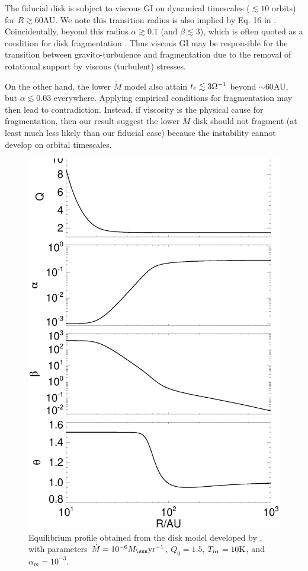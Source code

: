 The fiducial disk is subject to viscous GI on dynamical timescales
($\lesssim 10$ orbits) for $R\gtrsim60$AU. We note this transition
radius is also implied by Eq. 16 in \cite{kratter10}. Coincidentally,
beyond this radius $\alpha\gtrsim 0.1$ (and 
$\beta\lesssim 3$), which is often quoted as a condition for disk
fragmentation   
. Thus viscous GI may be responsible for 
the transition between gravito-turbulence and fragmentation due to the
removal of rotational support by viscous (turbulent) stresses. 

On the other hand, the lower $\dot{M}$ model also attain $t_\mathrm{c}\lesssim
3\Omega^{-1}$ beyond $\sim 60$AU, but $\alpha\lesssim 0.03$
everywhere. 
Applying empirical conditions for fragmentation may then lead to
contradiction. Instead, if viscosity is the physical cause for
fragmentation, then our result suggest the lower $\dot{M}$ disk should
not fragment (at least much less likely than our fiducial case) 
because the instability cannot develop on orbital timescales. 

\begin{figure}
  \includegraphics[width=\linewidth,clip=true,trim=0cm 0cm 0cm
    0.0cm]{figures/ppd_2d_basic}
  \caption{Equilibrium profile obtained from the disk model developed
    by \cite{rafikov15}, with parameters $\dot{M} =
    10^{-6}M_\sun\yr^{-1}$, $Q_0=1.5$, $T_\mathrm{irr}=10\mathrm{K}$, and
    $\alpha_m=10^{-3}$.   
    \label{rafikov_model}}
\end{figure}

